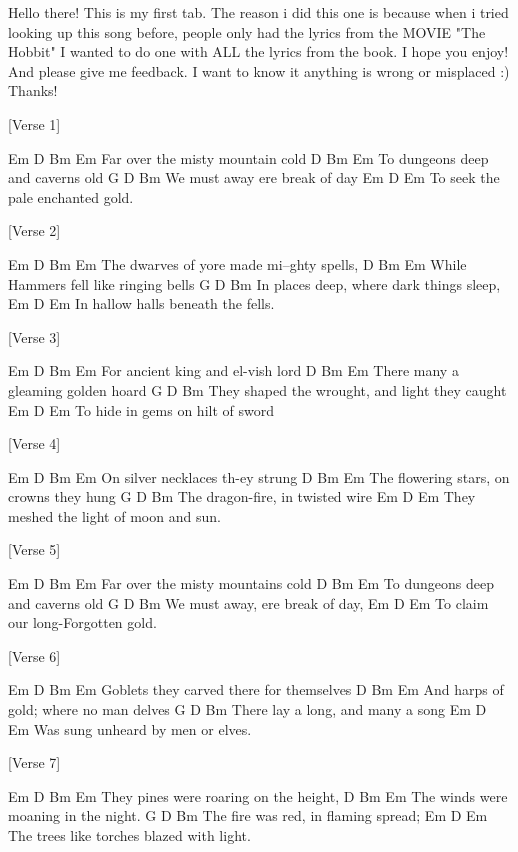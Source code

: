 Hello there! This is my first tab. The reason i did this one is because when i
tried looking up this song before, people only had the lyrics from the MOVIE "The
Hobbit" I wanted to do one with ALL the lyrics from the book. I hope you enjoy!
And please give me feedback. I want to know it anything is wrong or misplaced :) Thanks!


[Verse 1]

  Em      D      Bm       Em
Far over the misty mountain cold
          D        Bm      Em
To dungeons deep and caverns old
     G        D         Bm
We must away ere break of day
         Em      D       Em
To seek the pale enchanted gold.


[Verse 2]

             Em        D   Bm    Em
The dwarves of yore made mi--ghty spells,
            D         Bm      Em
While Hammers fell like ringing bells
         G           D          Bm
In places deep, where dark things sleep,
        Em        D       Em
In hallow halls beneath the fells.


[Verse 3]

           Em     D   Bm  Em
For ancient king and el-vish lord
             D       Bm     Em
There many a gleaming golden hoard
                G           D           Bm
They shaped the wrought, and light they caught
          Em     D       Em
To hide in gems on hilt of sword


[Verse 4]

            Em   D  Bm   Em
On silver necklaces th-ey strung
             D         Bm         Em
The flowering stars, on crowns they hung
          G         D       Bm
The dragon-fire, in twisted wire
               Em       D       Em
They meshed the light of moon and sun.


[Verse 5]

   Em       D        Bm     Em
Far over the misty mountains cold
           D        Bm      Em
To dungeons deep and caverns old
       G         D       Bm
We must away, ere break of day,
           Em     D        Em
To claim our long-Forgotten gold.


[Verse 6]

             Em    D    Bm    Em
Goblets they carved there for themselves
            D             Bm   Em
And harps of gold; where no man delves
           G         D      Bm
There lay a long, and many a song
        Em        D        Em
Was sung unheard by men or elves.


[Verse 7]

                 Em  D   Bm   Em
They pines were roaring on the height,
               D    Bm      Em
The winds were moaning in the night.
           G        D        Bm
The fire was red, in flaming spread;
              Em      D           Em
The trees like torches blazed with light.


